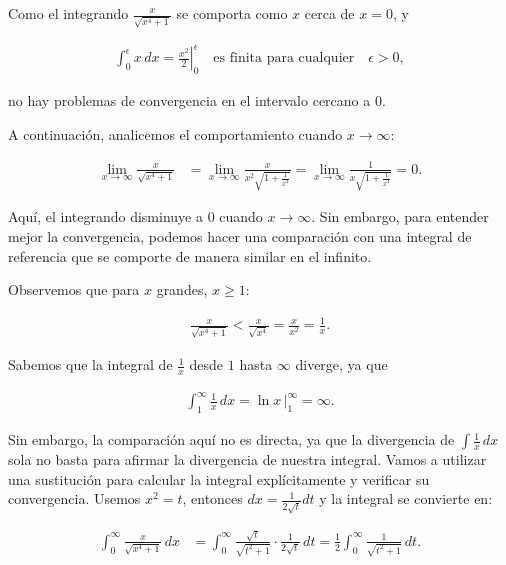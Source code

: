 \documentclass{article}
\begin{document}
    Como el integrando $\frac{x}{\sqrt{x^4 + 1}}$ se comporta como $x$ cerca de $x=0$, y

    \begin{align*}
    \int_0^\epsilon x \, dx = \left. \frac{x^2}{2} \right|_0^\epsilon \quad \text{es finita para cualquier} \quad \epsilon > 0,
    \end{align*}

    no hay problemas de convergencia en el intervalo cercano a $0$.

    A continuación, analicemos el comportamiento cuando $x \to \infty$:

    \begin{align*}
    \lim_{x \to \infty} \frac{x}{\sqrt{x^4 + 1}}
    &= \lim_{x \to \infty} \frac{x}{x^2 \sqrt{1 + \frac{1}{x^4}}}
    = \lim_{x \to \infty} \frac{1}{x \sqrt{1 + \frac{1}{x^4}}} = 0.
    \end{align*}

    Aquí, el integrando disminuye a $0$ cuando $x \to \infty$. Sin embargo, para entender mejor la convergencia, podemos hacer una comparación con una integral de referencia que se comporte de manera similar en el infinito.

    Observemos que para $x$ grandes, $x \geq 1$:

    \begin{align*}
    \frac{x}{\sqrt{x^4 + 1}} < \frac{x}{\sqrt{x^4}} = \frac{x}{x^2} = \frac{1}{x}.
    \end{align*}

    Sabemos que la integral de $\frac{1}{x}$ desde $1$ hasta $\infty$ diverge, ya que

    \begin{align*}
    \int_1^\infty \frac{1}{x} \, dx = \left. \ln x \, \right|_1^\infty = \infty.
    \end{align*}

    Sin embargo, la comparación aquí no es directa, ya que la divergencia de $\int \frac{1}{x} \, dx$ sola no basta para afirmar la divergencia de nuestra integral. Vamos a utilizar una sustitución para calcular la integral explícitamente y verificar su convergencia. Usemos $x^2 = t$, entonces $dx = \frac{1}{2\sqrt{t}} dt$ y la integral se convierte en:

    \begin{align*}
    \int_{0}^{\infty} \frac{x}{\sqrt{x^{4}+1}} \, dx
    &= \int_{0}^{\infty} \frac{\sqrt{t}}{\sqrt{t^2+1}} \cdot \frac{1}{2\sqrt{t}} \, dt
    = \frac{1}{2} \int_{0}^{\infty} \frac{1}{\sqrt{t^2+1}} \, dt.
    \end{align*}
\end{document}
